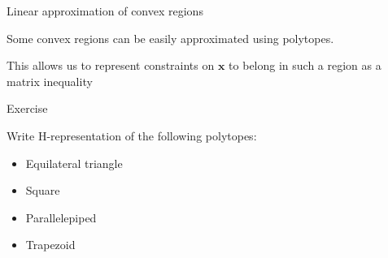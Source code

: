 \documentclass{beamer}
\begin{document}
\begin{frame}{Linear approximation of convex regions}
\begin{flushleft}
Some convex regions can be easily approximated using polytopes.


%
This allows us to represent constraints on $\mathbf{x}$ to belong in such a region as a matrix inequality
 
\end{flushleft}
\end{frame}



\begin{frame}{Exercise}
\begin{flushleft}

Write H-representation of the following polytopes:

\begin{itemize}
    \item Equilateral triangle
    \item Square
    \item Parallelepiped
    \item Trapezoid
\end{itemize}

\end{flushleft}
\end{frame}





\myqrframe
\end{document}
